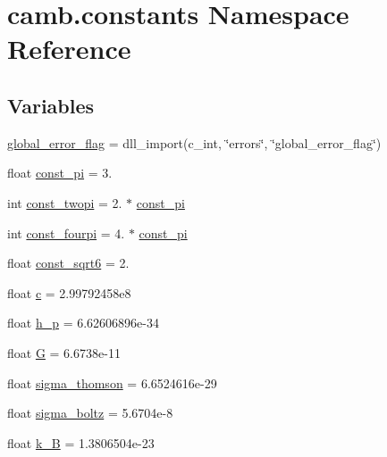 \hypertarget{namespacecamb_1_1constants}{}\section{camb.\+constants Namespace Reference}
\label{namespacecamb_1_1constants}
\subsection*{Variables}
\begin{DoxyCompactItemize}
\item 
\mbox{\hyperlink{namespacecamb_1_1constants_a0c78c1bb592d076f6610ee4ac09b9344}{global\+\_\+error\+\_\+flag}} = dll\+\_\+import(c\+\_\+int, \char`\"{}errors\char`\"{}, \char`\"{}global\+\_\+error\+\_\+flag\char`\"{})
\item 
float \mbox{\hyperlink{namespacecamb_1_1constants_a1020ead9e0e4db6bc81ad82aa777cd28}{const\+\_\+pi}} = 3.
\item 
int \mbox{\hyperlink{namespacecamb_1_1constants_aa5389f2122c7f077efb07830d8571fbf}{const\+\_\+twopi}} = 2. $\ast$ \mbox{\hyperlink{namespacecamb_1_1constants_a1020ead9e0e4db6bc81ad82aa777cd28}{const\+\_\+pi}}
\item 
int \mbox{\hyperlink{namespacecamb_1_1constants_ad56c9ed9d22471c47b221663d0ce4b16}{const\+\_\+fourpi}} = 4. $\ast$ \mbox{\hyperlink{namespacecamb_1_1constants_a1020ead9e0e4db6bc81ad82aa777cd28}{const\+\_\+pi}}
\item 
float \mbox{\hyperlink{namespacecamb_1_1constants_af64dc2bb71ee2d3165305d45032dcdd9}{const\+\_\+sqrt6}} = 2.
\item 
float \mbox{\hyperlink{namespacecamb_1_1constants_a08e77640ea70d03f8c60ba9f7f2644b9}{c}} = 2.\+99792458e8
\item 
float \mbox{\hyperlink{namespacecamb_1_1constants_ab268b921161c6a8a467bda8f21df3d17}{h\+\_\+p}} = 6.\+62606896e-\/34
\item 
float \mbox{\hyperlink{namespacecamb_1_1constants_a8ecaeb4a72719c13ff41d52253539559}{G}} = 6.\+6738e-\/11
\item 
float \mbox{\hyperlink{namespacecamb_1_1constants_a54e7464202a97543518691e8cd2120ce}{sigma\+\_\+thomson}} = 6.\+6524616e-\/29
\item 
float \mbox{\hyperlink{namespacecamb_1_1constants_aefb5b86a5737439523452c221430a09a}{sigma\+\_\+boltz}} = 5.\+6704e-\/8
\item 
float \mbox{\hyperlink{namespacecamb_1_1constants_af524d81ee3b1617ff9509b924eae87cd}{k\+\_\+B}} = 1.\+3806504e-\/23

\end{DoxyCompactItemize}
